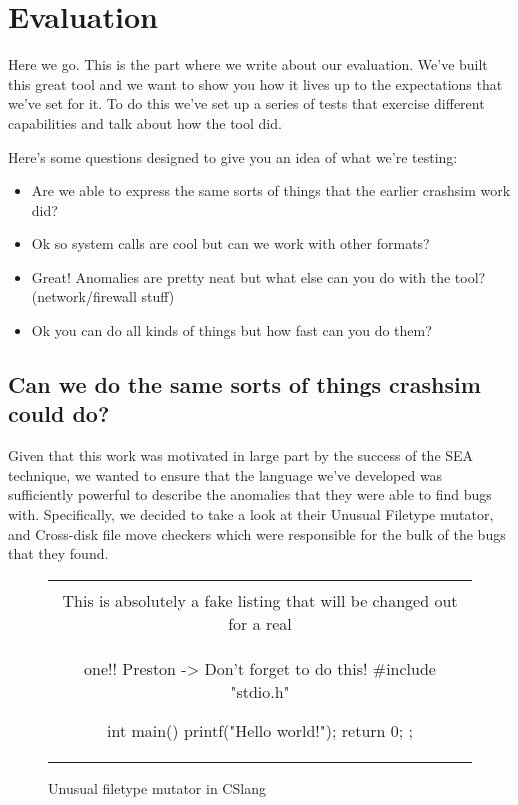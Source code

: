 \section{Evaluation}
\label{SEC:evaluation}

Here we go.  This is the part where we write about our evaluation.  We've
built this great tool and we want to show you how it lives up to the
expectations that we've set for it.  To do this we've set up a series of
tests that exercise different capabilities and talk about how the tool did.

Here's some questions designed to give you an idea of what we're testing:


\begin{itemize}

  \item{Are we able to express the same sorts of things that the earlier
    crashsim work did?}

  \item{Ok so system calls are cool but can we work with other formats?}

  \item{Great! Anomalies are pretty neat but what else can you do with the
    tool? (network/firewall stuff)}

  \item{Ok you can do all kinds of things but how fast can you do them?}

\end{itemize}


\subsection{Can we do the same sorts of things crashsim could do?}

Given that this work was motivated
in large part
by the success of the SEA technique,
we wanted to ensure that
the language we've developed
was sufficiently powerful
to describe the anomalies that they were able to find bugs with.
Specifically, we decided to take a look at their Unusual Filetype mutator,
and Cross-disk file move checkers which were responsible for the bulk of
the bugs that they found.

\begin{figure}[H]
\centering
\begin{tabular}{c}
\begin{lstlisting}
\\ This is absolutely a fake listing that will be changed out for a real
\\ one!!  Preston -> Don't forget to do this!
#include "stdio.h"

int main() {
    printf("Hello world!\n");
    return 0;
};
\end{lstlisting}
\end{tabular}
\caption{Unusual filetype mutator in CSlang}
\label{lst:UnusualFiletypeCSlang}
\end{figure}

